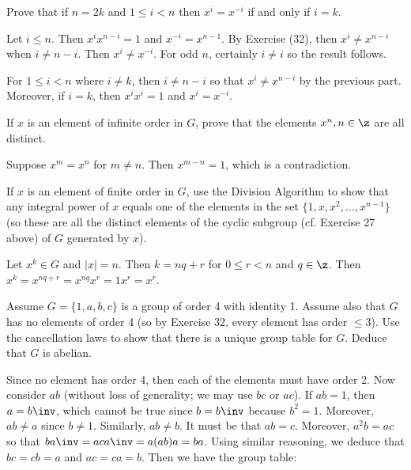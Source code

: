 \begin{problems}
\begin{problems}
        \item Prove that if $n = 2k$ and $1 \leq i < n$ then $x^i = x^{-i}$ if and only if $i = k$.
    \end{problems}
    \begin{solalph}
        \item Let $i \leq n$. Then $x^ix^{n - i} = 1$ and $x^{-i} = x^{n - 1}$. By Exercise (32), then $x^{i} \neq x^{n - i}$ when $i \neq n - i$. Then $x^i \neq x^{-i}$. For odd $n$, certainly $i \neq i$ so the result follows.
        \item For $1 \leq i < n$ where $i \neq k$, then $i \neq n - i$ so that $x^i \neq x^{n - i}$ by the previous part. Moreover, if $i = k$, then $x^ix^i = 1$ and $x^i = x^{-i}$. 
    \end{solalph}
    \item If $x$ is an element of infinite order in $G$, prove that the elements $x^n, n \in \z$ are all distinct.
    \begin{sol}
        Suppose $x^m = x^n$ for $m \neq n$. Then $x^{m - n} = 1$, which is a contradiction.
    \end{sol}
    \item If $x$ is an element of finite order in $G$, use the Division Algorithm to show that any integral power of $x$ equals one of the elements in the set $\{1, x, x^2, \dots, x^{n-1}\}$ (so these are all the distinct elements of the cyclic subgroup (cf. Exercise 27 above) of $G$ generated by $x$).
    \begin{sol}
        Let $x^k \in G$ and $|x| = n$. Then $k = nq + r$ for $0 \leq r < n$ and $q \in \z$. Then $x^k = x^{nq + r} = x^{nq}x^r = 1x^r = x^r$.
    \end{sol}
    \item \label{ex1.1.36} Assume $G = \{1, a, b, c\}$ is a group of order 4 with identity 1. Assume also that $G$ has no elements of order 4 (so by Exercise 32, every element has order $\leq 3$). Use the cancellation laws to show that there is a unique group table for $G$. Deduce that $G$ is abelian.
    \begin{sol}
        Since no element has order 4, then each of the elements must have order 2. Now consider $ab$ (without loss of generality; we may use $bc$ or $ac$). If $ab = 1$, then $a = b\inv$, which cannot be true since $b = b\inv$ because $b^2 = 1$. Moreover, $ab \neq a$ since $b \neq  1$. Similarly, $ab \neq b$. It must be that $ab = c$. Moreover, $a^2b = ac$ so that $ba\inv = aca\inv = a(ab)a = ba$. Using similar reasoning, we deduce that $bc = cb = a$ and $ac = ca = b$. Then we have the group table:

\end{sol}
\end{problems}
